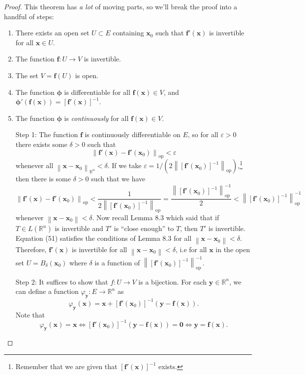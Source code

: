 \documentclass{article}
\newcommand{\R}{\mathbb{R}}
\newcommand{\x}{\mathbf{x}}
\newcommand{\f}{\mathbf{f}}
\newcommand{\y}{\mathbf{y}}
\newcommand{\ze}{\mathbf{0}}
\newcommand{\norm}[1]{\left\lVert#1\right\rVert}
\newcommand{\normop}[1]{\left\lVert#1\right\rVert_\text{op}}
\theoremstyle{definition}
\begin{document}
	\begin{proof}
		This theorem has \textit{a lot} of moving parts, so we'll break the proof into a handful of steps:
		\begin{enumerate}
			\item There exists an open set $ U\subset E $ containing $ \x_0 $ such that $ \f'(\x) $ is invertible for all $ \x \in U $. 
			\item The function $ \f:U\to V $ is invertible. 
			\item The set $ V = \f(U) $ is open. 
			\item The function $ \boldsymbol{\phi} $ is differentiable for all $ \f(\x)\in V $, and $ \boldsymbol{\phi}'(\f(\x)) = [\f'(\x)]^{-1}$. 
			\item The function $ \boldsymbol{\phi} $ is \textit{continuously} for all $ \f(\x)\in V $. 
		\end{enumerate}
		\begin{enumerate}
			\item [Step 1:]The function $ \f $ is continuously differentiable on $ E $, so for all $ \varepsilon > 0 $ there exists some $ \delta > 0 $ such that $$\normop{\f'(\x) - \f'(\x_0)} < \varepsilon$$ whenever all $ \norm{\x - \x_0}_{\R^n} < \delta $. If we take $ \varepsilon = 1/\left(2\normop{[\f'(\x_0)]^{-1}} \right)$,\footnote{Remember that we are given that $ [\f'(\x)]^{-1} $ exists.} then there is some $ \delta > 0$ such that we have 
			\begin{equation}\label{key}
				\normop{\f'(\x) - \f'(\x_0)} < \frac{1}{2\normop{[\f'(\x_0)]^{-1}}} = \frac{\normop{[\f'(\x_0)]^{-1}}^{-1}}{2} < \normop{[\f'(\x_0)]^{-1}}^{-1} 
			\end{equation} whenever $ \norm{\x - \x_0} < \delta $. Now recall Lemma 8.3 which said that if $ T\in L(\R^n) $ is invertible and $ T' $ is ``close enough'' to $ T $, then $ T' $ is invertible. Equation (51) satisfies the conditions of Lemma 8.3 for all $ \norm{\x-\x_0}<\delta $. Therefore, $ \f'(\x) $ is invertible for all $ \norm{\x-\x_0}<\delta $, i.e for all $ \x $ in the open set $U= B_\delta(\x_0) $ where $ \delta $ is a function of  $  \normop{[\f'(\x_0)]^{-1}}^{-1}   $. 
			\item [Step 2:]It suffices to show that $ f:U\to V $ is a bijection. For each $ \y\in\R^n $, we can define a function $ \varphi_\y:E\to \R^n $ as 
			$$ \varphi_\y(\x) = \x + [\f'(\x_0)]^{-1}(\y - \f(\x)) .$$ 
			Note that \begin{equation}\label{key}
				\varphi_\y(\x) = \x \iff [\f'(\x_0)]^{-1}(\y - \f(\x)) = \ze \iff \y = \f(\x) .

\end{equation}
\end{enumerate}
\end{proof}
\end{document}
